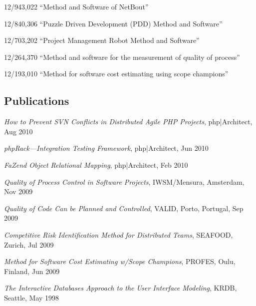\documentclass[12pt]{article}
\begin{document}
12/943,022 ``Method and Software of NetBout''

12/840,306 ``Puzzle Driven Development (PDD) Method and Software''

12/703,202 ``Project Management Robot Method and Software''

12/264,370 ``Method and software for the measurement of quality of process''

12/193,010 ``Method for software cost estimating using scope champions''

\subsection*{Publications}

\emph{How to Prevent SVN Conflicts in Distributed Agile PHP Projects},
php|Architect, Aug 2010

\emph{phpRack---Integration Testing Framework},
php|Architect, Jun 2010

\emph{FaZend Object Relational Mapping},
php|Architect, Feb 2010

\emph{Quality of Process Control in Software Projects},
IWSM/Mensura, Amsterdam, Nov 2009

\emph{Quality of Code Can be Planned and Controlled},
VALID, Porto, Portugal, Sep 2009

\emph{Competitive Risk Identification Method for Distributed Teams},
SEAFOOD, Zurich, Jul 2009

\emph{Method for Software Cost Estimating w/Scope Champions},
PROFES, Oulu, Finland, Jun 2009

\emph{The Interactive Databases Approach to the User Interface Modeling},
KRDB, Seattle, May 1998
\end{document}
